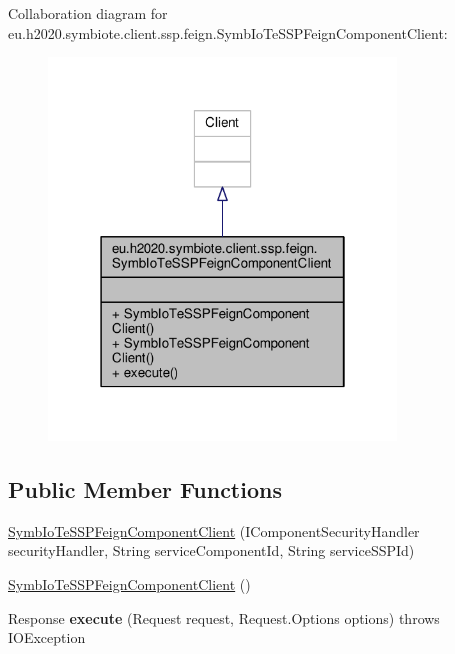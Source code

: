 Collaboration diagram for eu.\+h2020.\+symbiote.\+client.\+ssp.\+feign.\+Symb\+Io\+Te\+S\+S\+P\+Feign\+Component\+Client\+:\nopagebreak
\begin{figure}[H]
\begin{center}
\leavevmode
\includegraphics[width=262pt]{classeu_1_1h2020_1_1symbiote_1_1client_1_1ssp_1_1feign_1_1SymbIoTeSSPFeignComponentClient__coll__graph}
\end{center}
\end{figure}
\subsection*{Public Member Functions}
\begin{DoxyCompactItemize}
\item 
\hyperlink{classeu_1_1h2020_1_1symbiote_1_1client_1_1ssp_1_1feign_1_1SymbIoTeSSPFeignComponentClient_a7c0f4dd8e298fb895d69a0c532dd3ded}{Symb\+Io\+Te\+S\+S\+P\+Feign\+Component\+Client} (I\+Component\+Security\+Handler security\+Handler, String service\+Component\+Id, String service\+S\+S\+P\+Id)
\item 
\hyperlink{classeu_1_1h2020_1_1symbiote_1_1client_1_1ssp_1_1feign_1_1SymbIoTeSSPFeignComponentClient_a925bf1c211deee7ebf9555259ecdc636}{Symb\+Io\+Te\+S\+S\+P\+Feign\+Component\+Client} ()
\item 
\mbox{\label{classeu_1_1h2020_1_1symbiote_1_1client_1_1ssp_1_1feign_1_1SymbIoTeSSPFeignComponentClient_ad39f4e73e8e3382f6d6a87859115b184}} 
Response {\bfseries execute} (Request request, Request.\+Options options)  throws I\+O\+Exception 
\end{DoxyCompactItemize}


